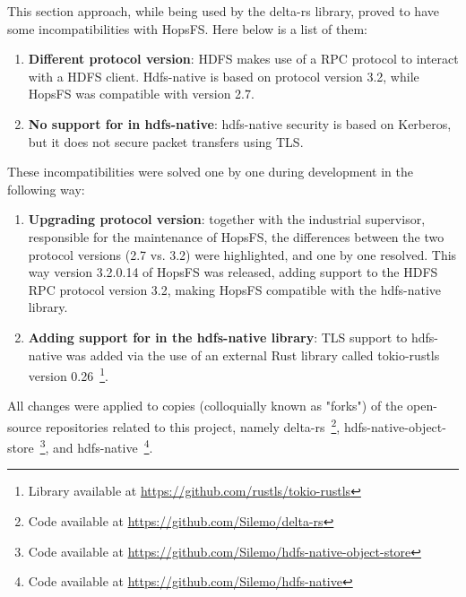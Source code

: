 
This section approach, while being used by the delta-rs library, proved to have some incompatibilities with \gls{HopsFS}. Here below is a list of them:
\begin{enumerate}
  \item \textbf{Different  protocol version}: \gls{HDFS} makes use of a \gls{RPC} protocol to interact with a \gls{HDFS} client. Hdfs-native is based on protocol version 3.2, while \gls{HopsFS} was compatible with version 2.7.
  \item \textbf{No support for  in hdfs-native}: hdfs-native security is based on Kerberos, but it does not secure packet transfers using \gls{TLS}.
\end{enumerate}
These incompatibilities were solved one by one during development in the following way:
\begin{enumerate}
  \item \textbf{Upgrading  protocol version}: together with the industrial supervisor, responsible for the maintenance of \gls{HopsFS}, the differences between the two protocol versions (2.7 vs. 3.2) were highlighted, and one by one resolved. This way version 3.2.0.14 of \gls{HopsFS} was released, adding support to the \gls{HDFS} \gls{RPC} protocol version 3.2, making \gls{HopsFS} compatible with the hdfs-native library.
  \item \textbf{Adding support for  in the hdfs-native library}: \gls{TLS} support to hdfs-native was added via the use of an external Rust library called tokio-rustls version 0.26~\footnote{Library available at \url{https://github.com/rustls/tokio-rustls}}.
\end{enumerate}

All changes were applied to copies (colloquially known as "forks") of the open-source repositories related to this project, namely delta-rs~\footnote{Code available at \url{https://github.com/Silemo/delta-rs}}, hdfs-native-object-store~\footnote{Code available at \url{https://github.com/Silemo/hdfs-native-object-store}}, and hdfs-native~\footnote{Code available at \url{https://github.com/Silemo/hdfs-native}}.